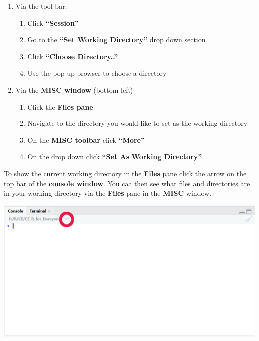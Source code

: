 \documentclass[]{book}
\providecommand{\tightlist}{%
  \setlength{\itemsep}{0pt}\setlength{\parskip}{0pt}}
\begin{document}
\begin{enumerate}
\def\labelenumi{\arabic{enumi}.}
\tightlist
\item
  Via the tool bar:

  \begin{enumerate}
  \def\labelenumii{\arabic{enumii}.}
  \tightlist
  \item
    Click \textbf{``Session''}
  \item
    Go to the \textbf{``Set Working Directory''} drop down section
  \item
    Click \textbf{``Choose Directory..''}
  \item
    Use the pop-up browser to choose a directory
  \end{enumerate}
\item
  Via the \textbf{MISC window} (bottom left)

  \begin{enumerate}
  \def\labelenumii{\arabic{enumii}.}
  \tightlist
  \item
    Click the \textbf{Files pane}
  \item
    Navigate to the directory you would like to set as the working
    directory
  \item
    On the \textbf{MISC toolbar} click \textbf{``More''}
  \item
    On the drop down click \textbf{``Set As Working Directory''}
  \end{enumerate}
\end{enumerate}

To show the current working directory in the \textbf{Files} pane click
the arrow on the top bar of the \textbf{console window}. You can then
see what files and directories are in your working directory via the
\textbf{Files} pane in the \textbf{MISC} window.

\begin{center}\includegraphics[width=0.8\linewidth]{figures/see_files} \end{center}
\end{document}
